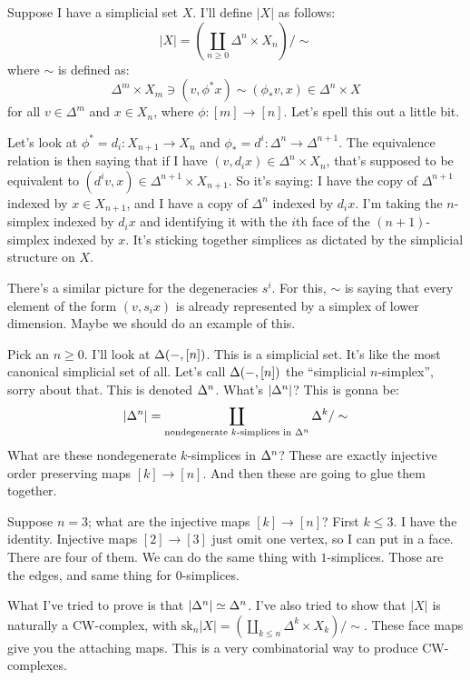 Suppose I have a simplicial set $X$. I'll define $|X|$ as follows:
$$
|X| = \left(\coprod_{n\geq 0}\Delta^n\times X_n\right)/\sim
$$
where $\sim$ is defined as:
$$
\Delta^m\times X_m\ni (v,\phi^\ast x)\sim (\phi_\ast v, x)\in \Delta^n\times X
$$
for all $v\in \Delta^m$ and $x\in X_n$, where $\phi:[m]\to [n]$.
Let's spell this out a little bit.
\begin{example}
    Let's look at $\phi^\ast = d_i:X_{n+1}\to X_n$ and $\phi_\ast = d^i:\Delta^n\to \Delta^{n+1}$.
    The equivalence relation is then saying that if I have $(v,d_ix)\in \Delta^n\times X_n$, that's supposed to be equivalent to $(d^i v, x)\in \Delta^{n+1}\times X_{n+1}$.
    So it's saying: I have the copy of $\Delta^{n+1}$ indexed by $x\in X_{n+1}$, and I have a copy of $\Delta^n$ indexed by $d_i x$. I'm taking the $n$-simplex indexed by $d_i x$ and identifying it with the $i$th face of the $(n+1)$-simplex indexed by $x$.
    It's sticking together simplices as dictated by the simplicial structure on $X$.
\end{example}
There's a similar picture for the degeneracies $s^i$.
For this, $\sim$ is saying that every element of the form $(v,s_ix)$ is already represented by a simplex of lower dimension.
Maybe we should do an example of this.
\begin{example}
    Pick an $n\geq 0$. I'll look at ${\Delta}(-,[n])$. This is a simplicial set.
    It's like the most canonical simplicial set of all.
    Let's call ${\Delta}(-,[n])$ the ``simplicial $n$-simplex'', sorry about that. This is denoted ${\Delta}^n$.
    What's $|{\Delta}^n|$?
    This is gonna be:
    $$
    |{\Delta}^n| = \coprod_{\text{nondegenerate $k$-simplices in }{\Delta}^n}\Delta^k/\sim
    $$
    What are these nondegenerate $k$-simplices in ${\Delta}^n$? These are exactly injective order preserving maps $[k]\to[n]$.
    And then these are going to glue them together.

    Suppose $n=3$; what are the injective maps $[k]\to [n]$? First $k\leq 3$. I have the identity.
    Injective maps $[2]\to [3]$ just omit one vertex, so I can put in a face. There are four of them.
    We can do the same thing with $1$-simplices.
    Those are the edges, and same thing for $0$-simplices.
    
    What I've tried to prove is that $|{\Delta}^n| \simeq \Delta^n$.
    I've also tried to show that $|X|$ is naturally a CW-complex, with $\mathrm{sk}_n|X| = \left(\coprod_{k\leq n}\Delta^k\times X_k\right)/\sim$.
    These face maps give you the attaching maps.
    This is a very combinatorial way to produce CW-complexes.
\end{example}

